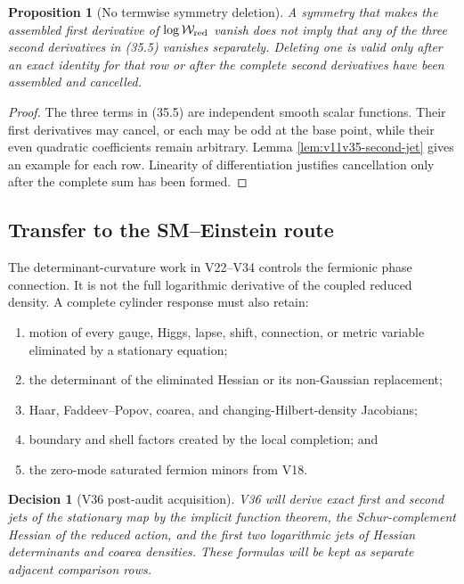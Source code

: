 \documentclass[11pt]{article}
\newtheorem{proposition}[theorem]{Proposition}
\newtheorem{decision}[theorem]{Decision}
\begin{document}
\begin{proposition}[No termwise symmetry deletion]
\label{prop:v11v35-no-deletion}
A symmetry that makes the assembled first derivative of
\(\log\mathcal W_{\rm red}\) vanish does not imply that any of the three
second derivatives in (35.5) vanishes separately.  Deleting one is
valid only after an exact identity for that row or after the complete
second derivatives have been assembled and cancelled.
\end{proposition}

\begin{proof}
The three terms in (35.5) are independent smooth scalar functions.
Their first derivatives may cancel, or each may be odd at the base
point, while their even quadratic coefficients remain arbitrary.
Lemma \ref{lem:v11v35-second-jet} gives an example for each row.
Linearity of differentiation justifies cancellation only after the
complete sum has been formed.
\end{proof}

\subsection{Transfer to the SM--Einstein route}

The determinant-curvature work in V22--V34 controls the fermionic phase
connection.  It is not the full logarithmic derivative of the coupled
reduced density.  A complete cylinder response must also retain:
\begin{enumerate}[label=\textnormal{(\roman*)}]
\item motion of every gauge, Higgs, lapse, shift, connection, or metric
variable eliminated by a stationary equation;
\item the determinant of the eliminated Hessian or its non-Gaussian
replacement;
\item Haar, Faddeev--Popov, coarea, and changing-Hilbert-density
Jacobians;
\item boundary and shell factors created by the local completion; and
\item the zero-mode saturated fermion minors from V18.
\end{enumerate}

\begin{decision}[V36 post-audit acquisition]
\label{dec:v11v35-next}
V36 will derive exact first and second jets of the stationary map by the
implicit function theorem, the Schur-complement Hessian of the reduced
action, and the first two logarithmic jets of Hessian determinants and
coarea densities.  These formulas will be kept as separate adjacent
comparison rows.
\end{decision}
\end{document}
